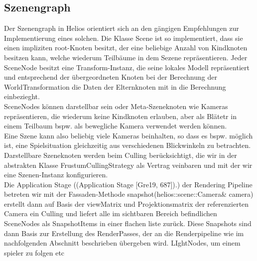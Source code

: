 \subsection{Szenengraph}
Der Szenengraph in Helios orientiert sich an den gängigen Empfehlungen zur Implementierung eines solchen. Die Klasse Scene ist so implementiert, dass sie einen impliziten root-Knoten besitzt, der eine beliebige Anzahl von Kindknoten besitzen kann, welche wiederum Teilbäume in dem Sezene repräsentieren. Jeder SceneNode besitzt eine Transform-Instanz, die seine lokales Modell repräsentiert und entsprechend der übergeordneten Knoten bei der Berechnung der WorldTransformation die Daten der Elternknoten mit in die Berechnung einbezieght.\\
SceneNodes können darstellbar sein oder Meta-Szeneknoten wie Kameras repräsentieren, die wiederum keine Kindknoten erlauben, aber als Blätetr in einem Teilbaum bspw. als bewegliche Kamera verwendet werden können.\\
Eine Szene kann also beliebig viele Kameras beinhalten, so dass es bspw. möglich ist, eine Spielsituation gleichzeitig aus verschiedenen Blickwinkeln zu betrachten.\\
Darstellbare Szeneknoten werden beim Culling berücksichtigt, die wir in der abstrakten Klasse FrustumCullingStrategy als Vertrag veinbaren und mit der wir eine Szenen-Instanz konfigurieren.\\
Die Application Stage ((Application Stage [Gre19, 687]).) der Rendering Pipeline betreten wir mit der Fassaden-Methode snapshot(helios::scene::Camera& camera) erstellt dann auf Basis der viewMatrix und Projektionsmatrix der referenzierten Camera ein Culling und liefert alle im sichtbaren Bereich befindlichen SceneNodes als SnapshotItems in einer flachen liste zurück. Diese Snapshots sind dann Basis zur Erstellung des RenderPasses, der an die Renderpipeline wie im nachfolgenden Abschnitt beschrieben übergeben wird. LIghtNodes, um einem spieler zu folgen etc

